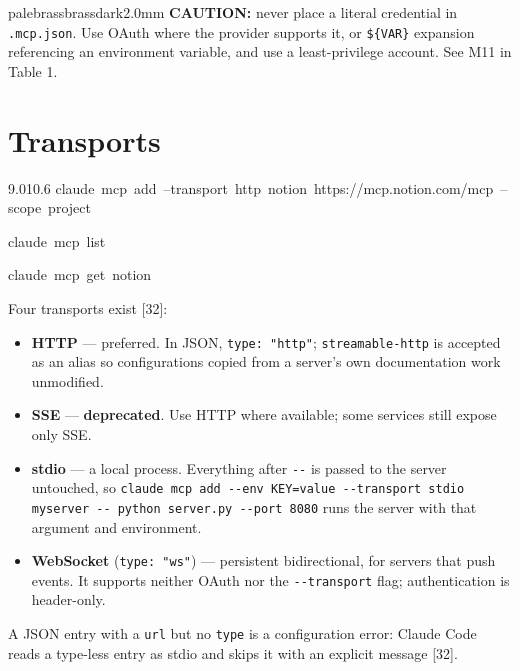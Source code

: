 \documentclass[11pt,a4paper,twoside,openany]{book}
\newcommand{\cl}[1]{\noindent\mbox{#1}\par}
\begin{document}
\begin{calloutbox}{palebrass}{brassdark}{2.0mm}
\textbf{CAUTION:} never place a literal credential in \texttt{.\allowbreak{}mcp.\allowbreak{}json}. Use OAuth where the provider supports it, or \texttt{\$\{VAR\}} expansion referencing an environment variable, and use a least-privilege account. See M11 in Table 1.
\end{calloutbox}

\FloatBarrier
\setcounter{section}{1}
\section{Transports}

\begin{codeblock}{9.0}{10.6}
\cl{claude~mcp~add~--transport~http~notion~https://mcp.notion.com/mcp~--scope~project}
\cl{claude~mcp~list}
\cl{claude~mcp~get~notion}
\end{codeblock}

Four transports exist [32]:


\begin{itemize}
\item \textbf{HTTP} — preferred. In JSON, \texttt{type:\allowbreak{} "http"}; \texttt{streamable-\allowbreak{}http} is accepted as an alias so configurations copied from a server's own documentation work unmodified.
\item \textbf{SSE} — \textbf{deprecated}. Use HTTP where available; some services still expose only SSE.
\item \textbf{stdio} — a local process. Everything after \texttt{-\allowbreak{}-\allowbreak{}} is passed to the server untouched, so \texttt{claude mcp \allowbreak{}add -\allowbreak{}-\allowbreak{}env KEY=\allowbreak{}value -\allowbreak{}-\allowbreak{}transport s\allowbreak{}tdio myserv\allowbreak{}er -\allowbreak{}-\allowbreak{} python ser\allowbreak{}ver.\allowbreak{}py -\allowbreak{}-\allowbreak{}port 8080} runs the server with that argument and environment.
\item \textbf{WebSocket} (\texttt{type:\allowbreak{} "ws"}) — persistent bidirectional, for servers that push events. It supports neither OAuth nor the \texttt{-\allowbreak{}-\allowbreak{}transport} flag; authentication is header-only.
\end{itemize}

A JSON entry with a \texttt{url} but no \texttt{type} is a configuration error: Claude Code reads a type-less entry as stdio and skips it with an explicit message [32].
\end{document}
